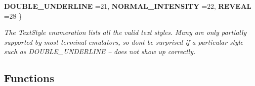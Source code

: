 \begin{DoxyCompactItemize}
{\bfseries D\+O\+U\+B\+L\+E\+\_\+\+U\+N\+D\+E\+R\+L\+I\+NE} =21, 
{\bfseries N\+O\+R\+M\+A\+L\+\_\+\+I\+N\+T\+E\+N\+S\+I\+TY} =22, 
{\bfseries R\+E\+V\+E\+AL} =28
 \}\hypertarget{namespaceconio_a4c720b3477d66baeb5a8c8c60b9d2002}{}\label{namespaceconio_a4c720b3477d66baeb5a8c8c60b9d2002}
\begin{DoxyCompactList}\small\item\em The Text\+Style enumeration lists all the valid text styles. Many are only partially supported by most terminal emulators, so don\textquotesingle{}t be surprised if a particular style -- such as D\+O\+U\+B\+L\+E\+\_\+\+U\+N\+D\+E\+R\+L\+I\+NE -- does not show up correctly. \end{DoxyCompactList}
\end{DoxyCompactItemize}
\subsection*{Functions}
